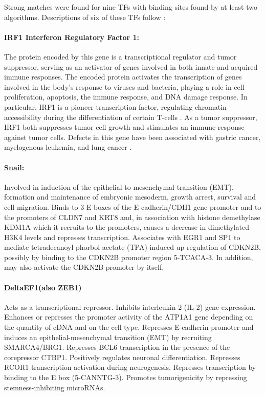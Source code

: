 \documentclass[12pt]{article}
\begin{document}
Strong matches were found for nine TFs with binding sites found by at least two algorithms. Descriptions of six of these TFs follow \citep{Weizmann2018}:

\paragraph{IRF1 Interferon Regulatory Factor 1:}
The protein encoded by this gene is a transcriptional regulator and tumor suppressor, serving as an activator of genes involved in both innate and acquired immune responses. The encoded protein activates the transcription of genes involved in the body's response to viruses and bacteria, playing a role in cell proliferation, apoptosis, the immune response, and DNA damage response. In particular, IRF1 is a pioneer transcription factor, regulating chromatin accessibility during the differentiation of certain T-cells \citep{Karwacz2017}. As a tumor suppressor, IRF1 both suppresses tumor cell growth and stimulates an immune response against tumor cells. Defects in this gene have been associated with gastric cancer, myelogenous leukemia, and lung cancer \citep{Weizmann2018}.

\paragraph{Snail:}
Involved in induction of the epithelial to mesenchymal transition (EMT), formation and maintenance of embryonic mesoderm, growth arrest, survival and cell migration. Binds to 3 E-boxes of the E-cadherin/CDH1 gene promoter and to the promoters of CLDN7 and KRT8 and, in association with histone demethylase KDM1A which it recruits to the promoters, causes a decrease in dimethylated H3K4 levels and represses transcription. Associates with EGR1 and SP1 to mediate tetradecanoyl phorbol acetate (TPA)-induced up-regulation of CDKN2B, possibly by binding to the CDKN2B promoter region 5-TCACA-3. In addition, may also activate the CDKN2B promoter by itself.


\paragraph{DeltaEF1(also ZEB1)}

Acts as a transcriptional repressor. Inhibits interleukin-2 (IL-2) gene expression. Enhances or represses the promoter activity of the ATP1A1 gene depending on the quantity of cDNA and on the cell type. Represses E-cadherin promoter and induces an epithelial-mesenchymal transition (EMT) by recruiting SMARCA4/BRG1. Represses BCL6 transcription in the presence of the corepressor CTBP1. Positively regulates neuronal differentiation. Represses RCOR1 transcription activation during neurogenesis. Represses transcription by binding to the E box (5-CANNTG-3). Promotes tumorigenicity by repressing stemness-inhibiting microRNAs.
\end{document}
